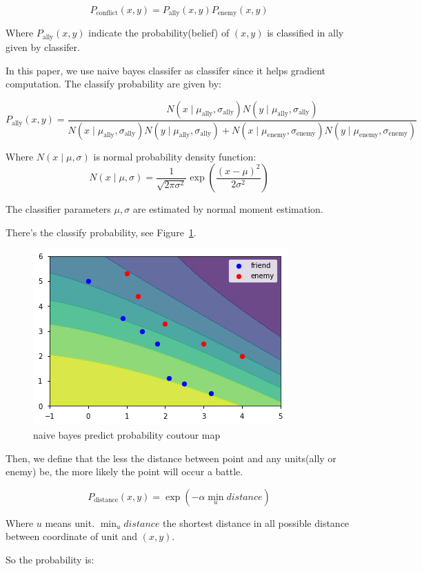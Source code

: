 \documentclass{article}
\begin{document}
$$
P_{\text{conflict}}(x,y) = P_\text{ally}(x,y) P_\text{enemy}(x,y)
$$

Where $P_\text{ally}(x,y)$ indicate the probability(belief) of $(x,y)$ is classified 
in ally given by classifer.

In this paper, we use naive bayes classifer as classifer since it helps gradient computation. The 
classify probability are given by:

$$
P_\text{ally}(x,y) = \frac{
N(x\mid \mu_\text{ally} ,\sigma_\text{ally}) N(y  \mid \mu_\text{ally}, \sigma_\text{ally})
}{
N(x \mid \mu_\text{ally} , \sigma_\text{ally}) N(y \mid \mu_\text{ally} , \sigma_\text{ally}) + 
N(x \mid \mu_\text{enemy} , \sigma_\text{enemy}) N(y \mid \mu_\text{enemy} , \sigma_\text{enemy})
}
$$

Where $N(x \mid \mu,\sigma)$ is normal probability density function:
$$
N(x \mid \mu,\sigma) = \frac{1}{\sqrt{2\pi \sigma^2}} \exp\left(\frac{(x-\mu)^2}{2\sigma^2}\right)
$$

The classifier parameters $\mu,\sigma$ are estimated by normal moment estimation.

There's the classify probability, see Figure~\ref{fig:naivebayes}.

\begin{figure}[h!]
\includegraphics[width=0.6\linewidth]{naivebayes.png}
\caption{naive bayes predict probability coutour map}
\label{fig:naivebayes}
\end{figure}

Then, we define that the less the distance between point and any units(ally or enemy) be,
the more likely the point will occur a battle.

$$
P_{\text{distance}}(x,y) = \exp(-\alpha \min_{u} distance)
$$

Where $u$ means unit. $\min_u distance$ the shortest distance in all possible distance 
between coordinate of unit and $(x,y)$.

So the probability is:
\end{document}

